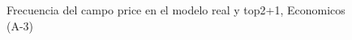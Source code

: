 \begin{figure}[H]
    \centering
    
    \caption{Frecuencia del campo  price en el modelo real y top2+1, Economicos (A-3)}
    \label{frecuency- Price-top2+1}
\end{figure}